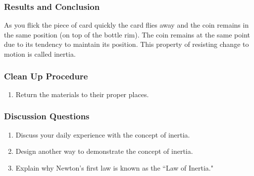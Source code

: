 \subsubsection*{Results and Conclusion}
As you flick the piece of card quickly the card flies away and the coin remains in the same position (on top of the bottle rim). The coin remains at the same point due to its tendency to maintain its position. This property of resisting change to motion is called inertia.

\subsubsection*{Clean Up Procedure}
\begin{enumerate}
\item{Return the materials to their proper places.} 
\end{enumerate}

\subsubsection*{Discussion Questions}
\begin{enumerate}
\item{Discuss your daily experience with the concept of inertia.} 
\item{Design another way to demonstrate the concept of inertia.} 
\item{Explain why Newton's first law is known as the ``Law of Inertia."}
\end{enumerate}

